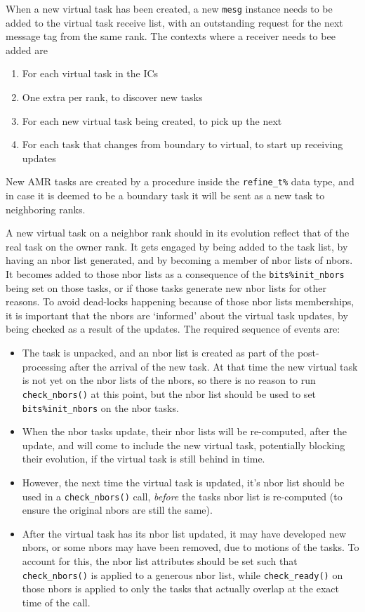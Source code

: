 \documentclass[paper=a4,fontsize=11pt]{scrartcl}
\numberwithin{equation}{section}		%
\numberwithin{figure}{section}			%
\numberwithin{table}{section}				%
\newcommand{\codecolor}{\color{Blue}}
\newcommand{\Code}[1]{{\codecolor\texttt{#1}}}
\def\checkready{\Code{check\_ready()}}
\def\checknbors{\Code{check\_nbors()}}
\begin{document}
When a new virtual task has been created, a new \Code{mesg} instance needs to be added to the virtual task receive list, with an outstanding request for the next message tag from the same rank.  The contexts where a receiver needs to bee added are
\begin{enumerate}
    \item For each virtual task in the ICs
    \item One extra per rank, to discover new tasks
    \item For each new virtual task being created, to pick up the next
    \item For each task that changes from boundary to virtual, to start up receiving updates
\end{enumerate}

New AMR tasks are created by a procedure inside the \Code{refine\_t\%} data type, and in case it is deemed to be a boundary task it will be sent as a new task to neighboring ranks.

A new virtual task on a neighbor rank should in its evolution reflect that of the real task on the owner rank.  It gets engaged by being added to the task list, by having an nbor list generated, and by becoming a member of nbor lists of nbors.  It becomes added to those nbor lists as a consequence of the \Code{bits\%init\_nbors} being set on those tasks, or if those tasks generate new nbor lists for other reasons.  To avoid dead-locks happening because of those nbor lists memberships, it is important that the nbors are `informed' about the virtual task updates, by being checked as a result of the updates.  The required sequence of events are:

\begin{itemize}
    \item The task is unpacked, and an nbor list is created as part of the post-processing after the arrival of the new task.  At that time the new virtual task is not yet on the nbor lists of the nbors, so there is no reason to run \checknbors{} at this point, but the nbor list should be used to set \Code{bits\%init\_nbors} on the nbor tasks.
    \item When the nbor tasks update, their nbor lists will be re-computed, after the update, and will come to include the new virtual task, potentially blocking their evolution, if the virtual task is still behind in time.
    \item However, the next time the virtual task is updated, it's nbor list should be used in a \checknbors{} call, \textit{before} the tasks nbor list is re-computed (to ensure the original nbors are still the same).
    \item After the virtual task has its nbor list updated, it may have developed new nbors, or some nbors may have been removed, due to motions of the tasks.  To account for this, the nbor list attributes should be set such that \checknbors{} is applied to a generous nbor list, while \checkready{} on those nbors is applied to only the tasks that actually overlap at the exact time of the call.
\end{itemize}
\end{document}
